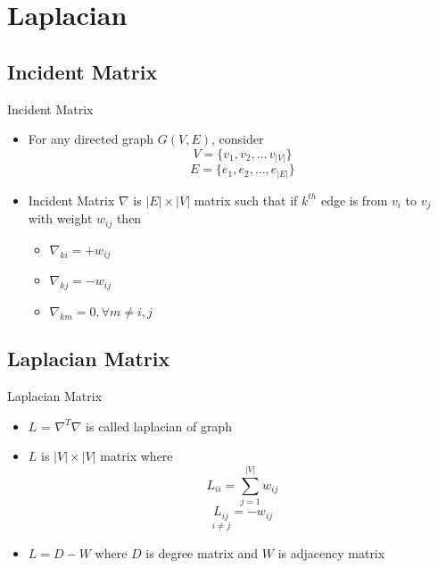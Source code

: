 \documentclass{beamer}
\begin{document}
\section{Laplacian}

\subsection{Incident Matrix}
\begin{frame}{Incident Matrix}

\begin{itemize}

	\item For any directed graph $G(V, E)$, consider $$V = \{v_1, v_2, \ldots\, v_{|V|}\}$$  $$E = \{e_1, e_2, \ldots, e_{|E|}\}$$ 
    \item Incident Matrix $\nabla$ is $|E| \times |V|$ matrix such that if $k^{th}$ edge is from $v_i$ to $v_j$ with weight $w_{ij}$ then
    \begin{itemize}
    	\item $\nabla_{ki} = +w_{ij}$ 
        \item $\nabla_{kj} = -w_{ij}$
        \item $\nabla_{km} = 0, \forall m \neq i, j$
	\end{itemize}
\end{itemize}

\end{frame}


\subsection{Laplacian Matrix}
\begin{frame}{Laplacian Matrix}

\begin{itemize}
	\item $L$ = $\nabla^T\nabla$ is called laplacian of graph
    \item $L$ is $|V| \times |V|$ matrix where 
      $$ L_{ii} = \sum_{j=1}^{|V|} w_{ij} $$
      $$ \underset{i \neq j} {L_{ij}} = -w_{ij} $$
    \item $L = D - W$ where $D$ is degree matrix and $W$ is adjacency matrix
\end{itemize}

\end{frame}


\end{document}
